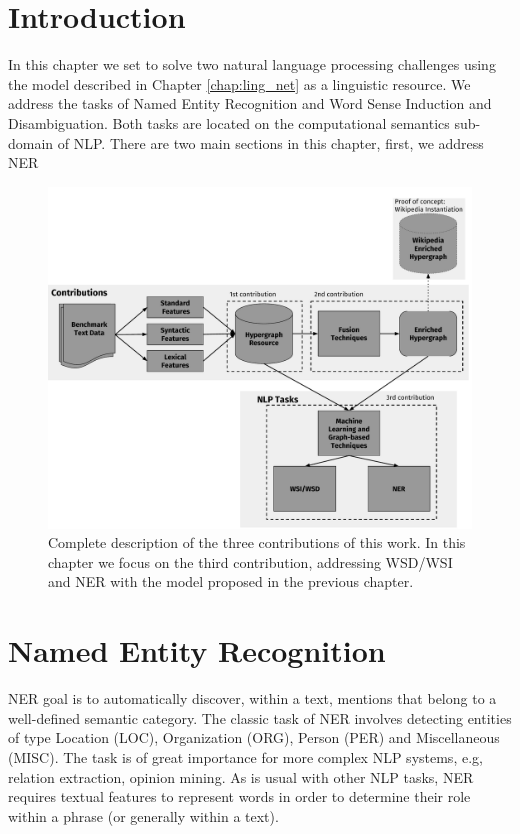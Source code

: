 \section{Introduction}
In this chapter we set to solve two natural language processing challenges using the model described in Chapter \ref{chap:ling_net} as a linguistic resource. We address the tasks of Named Entity Recognition and Word Sense Induction and Disambiguation. Both tasks are located on the computational semantics sub-domain of NLP.  %
There are two main sections in this chapter, first, we address NER 
\begin{figure}
\centering
\includegraphics[width=.9\linewidth]{images/Chapitre4/main_diag2.pdf}
\caption{Complete description of the three contributions of this work. In this chapter we focus on the third contribution, addressing WSD/WSI and NER with the model proposed in the previous chapter.}
\label{fig:main_diag2}
\end{figure}

\section{Named Entity Recognition}



 NER goal is to automatically discover, within a text, mentions that belong to a well-defined semantic category. The classic task of NER involves detecting entities of type Location (LOC), Organization (ORG), Person (PER) and Miscellaneous (MISC). The task is of great importance for more complex NLP systems, e.g, relation extraction, opinion mining.  As is usual with other NLP tasks, NER  requires textual features to represent words in order to determine their role within a phrase (or generally within a text).
 
